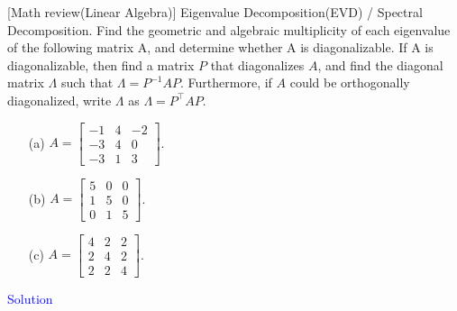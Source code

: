 \item {} [Math review(Linear Algebra)] Eigenvalue Decomposition(EVD) / Spectral Decomposition.
Find the geometric and algebraic multiplicity of each eigenvalue of the following matrix A, and determine whether A is diagonalizable. If A is diagonalizable, then find a matrix $P$ that diagonalizes $A$, and find the diagonal matrix $\Lambda$ such that $\Lambda = P^{-1}AP$. Furthermore, if $A$ could be orthogonally diagonalized, write $\Lambda$ as $\Lambda = P^{\top}AP$.

\begin{itemize}
    \item[(a)] $A=\begin{bmatrix} -1 & 4 & -2 \\ -3 & 4 & 0 \\ -3 & 1 & 3 \end{bmatrix}$. ~
    \item[(b)] $A=\begin{bmatrix} 5 & 0 & 0 \\ 1 & 5 & 0 \\ 0 & 1 & 5 \end{bmatrix}$. ~
    \item[(c)] $A=\begin{bmatrix} 4 & 2 & 2 \\ 2 & 4 & 2 \\ 2 & 2 & 4 \end{bmatrix}$. ~
\end{itemize}

\textcolor{blue}{Solution} \\








\newpage